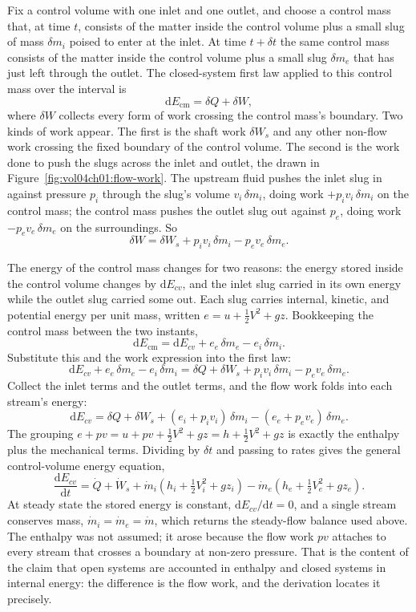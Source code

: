 Fix a control volume with one inlet and one outlet, and choose a
control mass that, at time $t$, consists of the matter inside the
control volume plus a small slug of mass $\delta m_i$ poised to enter
at the inlet. At time $t + \delta t$ the same control mass consists of
the matter inside the control volume plus a small slug $\delta m_e$ that
has just left through the outlet. The closed-system first law applied to
this control mass over the interval is
\[
\mathrm{d}E_{\text{cm}} = \delta Q + \delta W,
\]
where $\delta W$ collects every form of work crossing the control
mass's boundary. Two kinds of work appear. The first is the shaft work
$\delta W_s$ and any other non-flow work crossing the fixed boundary of
the control volume. The second is the work done to push the slugs across
the inlet and outlet, the  drawn in
Figure~\ref{fig:vol04ch01:flow-work}. The upstream fluid pushes the
inlet slug in against pressure $p_i$ through the slug's volume
$v_i\,\delta m_i$, doing work $+p_i v_i\,\delta m_i$ on the control mass;
the control mass pushes the outlet slug out against $p_e$, doing work
$-p_e v_e\,\delta m_e$ on the surroundings. So
\[
\delta W = \delta W_s + p_i v_i\,\delta m_i - p_e v_e\,\delta m_e.
\]



The energy of the control mass changes for two reasons: the energy
stored inside the control volume changes by $\mathrm{d}E_{cv}$, and the
inlet slug carried in its own energy while the outlet slug carried some
out. Each slug carries internal, kinetic, and potential energy per unit
mass, written $e = u + \tfrac12 V^2 + gz$. Bookkeeping the control mass
between the two instants,
\[
\mathrm{d}E_{\text{cm}} = \mathrm{d}E_{cv} + e_e\,\delta m_e -
e_i\,\delta m_i.
\]
Substitute this and the work expression into the first law:
\[
\mathrm{d}E_{cv} + e_e\,\delta m_e - e_i\,\delta m_i = \delta Q +
\delta W_s + p_i v_i\,\delta m_i - p_e v_e\,\delta m_e.
\]
Collect the inlet terms and the outlet terms, and the flow work folds
into each stream's energy:
\[
\mathrm{d}E_{cv} = \delta Q + \delta W_s +
(e_i + p_i v_i)\,\delta m_i - (e_e + p_e v_e)\,\delta m_e.
\]
The grouping $e + pv = u + pv + \tfrac12 V^2 + gz = h + \tfrac12 V^2 +
gz$ is exactly the enthalpy plus the mechanical terms. Dividing by
$\delta t$ and passing to rates gives the general control-volume energy
equation,
\[
\frac{\mathrm{d}E_{cv}}{\mathrm{d}t} = \dot{Q} + \dot{W}_s +
\dot{m}_i\!\left(h_i + \tfrac12 V_i^2 + gz_i\right) -
\dot{m}_e\!\left(h_e + \tfrac12 V_e^2 + gz_e\right).
\]
At steady state the stored energy is constant, $\mathrm{d}E_{cv}/
\mathrm{d}t = 0$, and a single stream conserves mass, $\dot{m}_i =
\dot{m}_e = \dot{m}$, which returns the steady-flow balance used above.
The enthalpy was not assumed; it arose because the flow work $pv$
attaches to every stream that crosses a boundary at non-zero pressure.
That is the content of the claim that open systems are accounted in
enthalpy and closed systems in internal energy: the difference is the
flow work, and the derivation locates it precisely.

